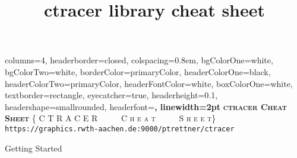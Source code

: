 \documentclass[landscape,a0paper,fontscale=0.285]{baposter} %
\title{ctracer library cheat sheet}
\begin{document}
\begin{poster}
{
    columns=4,
    headerborder=closed, %
    colspacing=0.8em, %
    bgColorOne=white, %
    bgColorTwo=white, %
    borderColor=primaryColor, %
    headerColorOne=black, %
    headerColorTwo=primaryColor, %
    headerFontColor=white, %
    boxColorOne=white, %
    textborder=rectangle, %
    eyecatcher=true, %
    headerheight=0.1\textheight, %
    headershape=smallrounded, %
    headerfont=\Large\bf\textsc, %
    linewidth=2pt %
}
{\bf\textsc{ctracer Cheat Sheet}\vspace{0.5em}} %
{\textsc{\{ C T R A C E R \ \ \ \ \ C h e a t \ \ \ \ \ S h e e t\} \hspace{12pt}} \vspace{0.2cm}}
{\texttt{https://graphics.rwth-aachen.de:9000/ptrettner/ctracer}}

%

\begin{posterbox}[name=gettingstarted,column=0]{Getting Started}


\end{posterbox}
\end{poster}
\end{document}
